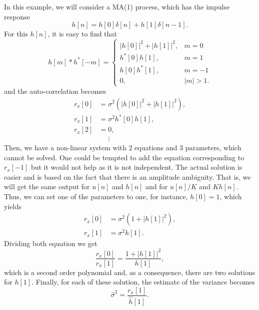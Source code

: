 \begin{example}
	
	In this example, we will consider a MA(1) process, which has the impulse response
	\begin{equation}
	h[n] = h[0] \delta[n] + h[1] \delta[n-1].
	\end{equation}
	For this $h[n]$, it is easy to find that
\begin{equation}
h[m] \ast  h^{\ast}[-m] =
\begin{cases}
|h[0]|^2 + |h[1]|^2, & m = 0 \\
h^{\ast}[0] h[1], & m = 1 \\
h[0] h^{\ast}[1], & m = -1 \\
0, & |m| > 1.
\end{cases}
\end{equation}
and the auto-correlation becomes
\begin{align*}
r_x[0] &= \sigma^2 \left(|h[0]|^2 + |h[1]|^2\right), \\
r_x[1] &= \sigma^2 h^{\ast}[0] h[1], \\
r_x[2] &= 0, \\
&\phantom{=} \vdots 
\end{align*}
Then, we have a non-linear system with $2$ equations and $3$ parameters, which cannot be solved. One could be tempted to add the equation corresponding to $r_x[-1]$ but it would not help as it is not independent. The actual solution is easier and is based on the fact that there is an amplitude ambiguity. That is, we will get the same output for $u[n]$ and $h[n]$ and for $u[n]/K$ and $K h[n]$. Thus, we can set one of the parameters to one, for instance, $h[0] = 1$, which yields
\begin{align*}
r_x[0] &= \sigma^2 \left(1 + |h[1]|^2\right), \\
r_x[1] &= \sigma^2 h[1].
\end{align*}
Dividing both equation we get
\begin{equation}
\frac{r_x[0]}{r_x[1]} = \frac{1 + |h[1]|^2}{h[1]},
\end{equation}
which is a second order polynomial and, as a consequence, there are two solutions for $h[1]$. Finally, for each of these solution, the estimate of the variance becomes
\begin{equation}
\hat{\sigma}^2 = \frac{r_x[1]}{\hat{h}[1]} .
\end{equation}

\end{example}
